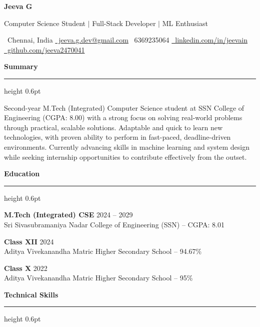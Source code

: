 \documentclass[10pt, a4paper]{article}
\newcommand{\name}[1]{{\fontsize{22pt}{22pt}\selectfont\color{primary}\textbf{#1}}}
\newcommand{\sectionhead}[1]{%
    \vspace{4pt}%
    {\fontsize{11pt}{13pt}\selectfont\color{sectioncolor}\textbf{#1}}%
    \vspace{1.5pt}%
    {\color{rulecolor}\hrule height 0.6pt}%
    \vspace{3pt}%
}
\newcommand{\edutitle}[2]{%
    \noindent\textbf{\color{sectioncolor}#1} \hfill {\color{subtext}#2}%
}
\begin{document}
\begin{center}
    \name{Jeeva G}
    \vspace{2pt}

    {\fontsize{11pt}{11pt}\selectfont\color{subtext}Computer Science Student $|$ Full-Stack Developer $|$ ML Enthusiast}

    \vspace{2pt}

    {\fontsize{9.5pt}{9.5pt}\selectfont
    \color{subtext}\faMapMarker*\ Chennai, India \quad
    \href{mailto:priyagovinth2019@gmail.com}{\faEnvelope\ jeeva.g.dev@gmail.com} \quad
    \faPhone*\ 6369235064 \quad
    \href{https://linkedin.com/in/jeevain/}{\faLinkedin\ linkedin.com/in/jeevain} \quad
    \href{https://github.com/jeeva2470041}{\faGithub\ github.com/jeeva2470041}
    }
\end{center}

\sectionhead{Summary}

{\fontsize{10pt}{12pt}\selectfont
Second-year M.Tech (Integrated) Computer Science student at SSN College of Engineering (CGPA: 8.00) with a strong focus on solving real-world problems through practical, scalable solutions. Adaptable and quick to learn new technologies, with proven ability to perform in fast-paced, deadline-driven environments. Currently advancing skills in machine learning and system design while seeking internship opportunities to contribute effectively from the outset.
}

\sectionhead{Education}

\edutitle{M.Tech (Integrated) CSE}{2024 -- 2029}\\
Sri Sivasubramaniya Nadar College of Engineering (SSN) -- CGPA: 8.01

\vspace{2pt}
\edutitle{Class XII}{2024}\\
Aditya Vivekanandha Matric Higher Secondary School -- 94.67\%

\vspace{2pt}
\edutitle{Class X}{2022}\\
Aditya Vivekanandha Matric Higher Secondary School -- 95\%

\sectionhead{Technical Skills}
\end{document}
